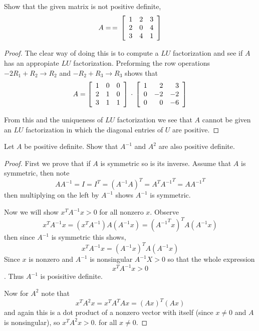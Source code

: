 \newpage 
\question
Show that the given matrix is not positive definite, 
\begin{equation}
    A =\, = \, 
    \mat{rrr}
    1 & 2 & 3 \\ 
    2 & 0 & 4 \\ 
    3 & 4 & 1 
    \rix 
\end{equation}

\begin{proof}
    The clear way of doing this is to compute a $LU$ factorization and see if $A$ has an appropiate $LU$ factorization.
    Preforming the row operations $-2R_1 + R_2 \to R_2$ and $-R_2 + R_3 \to R_3$ shows that 
    \begin{equation}
        A = 
        \mat{rrr}
        1 & 0 & 0 \\ 
        2 & 1 & 0 \\ 
        3 & 1 & 1 
        \rix
        \, \cdot \, 
        \mat{rrr}
        1 & 2 & 3 \\ 
        0 & -2 & -2 \\ 
        0 & 0 & -6 
        \rix
    \end{equation}

    From this and the uniqueness of $LU$ factorization we see that $A$ cannot be given an $LU$ factorization in which the diagonal entries of $U$ are positive. 
\end{proof}

\newpage 
\question 
Let $A$ be positive definite. Show that $A^{-1}$ and $A^2$ are also positive definite. 

\begin{proof}
    First we prove that if $A$ is symmetric so is its inverse. Assume that $A$ is symmetric, then note 
    \[ AA^{-1} = I = I^T = (A^{-1}A)^T = A^T{A^{-1}}^T = A{A^{-1}}^T \]
    then multiplying on the left by $A^{-1}$ shows $A^{-1}$ is symmetric. 

    Now we will show $x^T A^{-1} x > 0$ for all nonzero $x$. Observe 
    \[x^T A^{-1} x  = (x^T A^{-1})A(A^{-1} x) = ({A^{-1}}^Tx)^T A (A^{-1}x) \]
    then since $A^{-1}$ is symmetric this shows, 
    \[x^T A^{-1} x =  (A^{-1}x)^T A (A^{-1}x) \]
    Since $x$ is nonzero and $A^{-1}$ is nonsingular $A^{-1}X > 0$ so that the whole expression 
    \[x^T A^{-1}x > 0\]. 
    Thus $A^{-1}$ is posisitive definite. 

    Now for $A^2$ note that 
    \[x^TA^2x = x^TA^TAx = (Ax)^T(Ax)\]
    and again this is a dot product of a nonzero vector with itself (since $x \neq 0$ and $A$ is nonsingular), so $x^T A^2 x > 0$. 
    for all $x \neq 0$. 


    
\end{proof}


